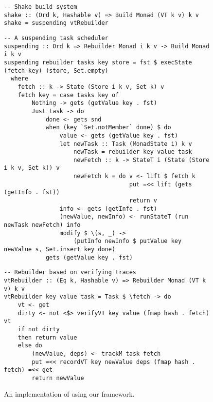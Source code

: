 \begin{figure}
\begin{verbatim}
-- Shake build system
shake :: (Ord k, Hashable v) => Build Monad (VT k v) k v
shake = suspending vtRebuilder
\end{verbatim}
\vspace{1mm}
\begin{verbatim}
-- A suspending task scheduler
suspending :: Ord k => Rebuilder Monad i k v -> Build Monad i k v
suspending rebuilder tasks key store = fst $ execState (fetch key) (store, Set.empty)
  where
    fetch :: k -> State (Store i k v, Set k) v
    fetch key = case tasks key of
        Nothing -> gets (getValue key . fst)
        Just task -> do
            done <- gets snd
            when (key `Set.notMember` done) $ do
                value <- gets (getValue key . fst)
                let newTask :: Task (MonadState i) k v
                    newTask = rebuilder key value task
                    newFetch :: k -> StateT i (State (Store i k v, Set k)) v
                    newFetch k = do v <- lift $ fetch k
                                    put =<< lift (gets (getInfo . fst))
                                    return v
                info <- gets (getInfo . fst)
                (newValue, newInfo) <- runStateT (run newTask newFetch) info
                modify $ \(s, _) ->
                    (putInfo newInfo $ putValue key newValue s, Set.insert key done)
            gets (getValue key . fst)
\end{verbatim}
\vspace{1mm}
\begin{verbatim}
-- Rebuilder based on verifying traces
vtRebuilder :: (Eq k, Hashable v) => Rebuilder Monad (VT k v) k v
vtRebuilder key value task = Task $ \fetch -> do
    vt <- get
    dirty <- not <$> verifyVT key value (fmap hash . fetch) vt
    if not dirty
    then return value
    else do
        (newValue, deps) <- trackM task fetch
        put =<< recordVT key newValue deps (fmap hash . fetch) =<< get
        return newValue
\end{verbatim}
\vspace{-3mm}
\caption{An implementation of \Shake using our framework.}\label{fig-shake-implementation}
\vspace{1mm}
\end{figure}

\vspace{-2mm}
\subsection{\Bazel}\label{sec-implementation-bazel}
\vspace{-1mm}

